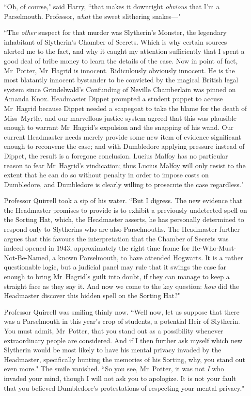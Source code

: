 ``Oh, of course," said Harry, ``that makes it downright \emph{obvious} that I'm a Parselmouth. Professor, \emph{what} the sweet slithering snakes—"

``The \emph{other} suspect for that murder was Slytherin's Monster, the legendary inhabitant of Slytherin's Chamber of Secrets. Which is why certain sources alerted me to the fact, and why it caught my attention sufficiently that I spent a good deal of bribe money to learn the details of the case. Now in point of fact, Mr~Potter, Mr~Hagrid is innocent. Ridiculously obviously innocent. He is the most blatantly innocent bystander to be convicted by the magical British legal system since Grindelwald's Confunding of Neville Chamberlain was pinned on Amanda Knox. Headmaster Dippet prompted a student puppet to accuse Mr~Hagrid because Dippet needed a scapegoat to take the blame for the death of Miss~Myrtle, and our marvellous justice system agreed that this was plausible enough to warrant Mr~Hagrid's expulsion and the snapping of his wand. Our current Headmaster needs merely provide some new item of evidence significant enough to reconvene the case; and with Dumbledore applying pressure instead of Dippet, the result is a foregone conclusion. Lucius Malfoy has no particular reason to fear Mr~Hagrid's vindication; thus Lucius Malfoy will only resist to the extent that he can do so without penalty in order to impose costs on Dumbledore, and Dumbledore is clearly willing to prosecute the case regardless."

Professor Quirrell took a sip of his water. ``But I digress. The new evidence that the Headmaster promises to provide is to exhibit a previously undetected spell on the Sorting Hat, which, the Headmaster asserts, he has personally determined to respond only to Slytherins who are also Parselmouths. The Headmaster further argues that this favours the interpretation that the Chamber of Secrets was indeed opened in 1943, approximately the right time frame for He-Who-Must-Not-Be-Named, a known Parselmouth, to have attended Hogwarts. It is a rather questionable logic, but a judicial panel may rule that it swings the case far enough to bring Mr~Hagrid's guilt into doubt, if they can manage to keep a straight face as they say it. And now we come to the key question: \emph{how} did the Headmaster discover this hidden spell on the Sorting Hat?"

Professor Quirrell was smiling thinly now. ``Well now, let us suppose that there was a Parselmouth in this year's crop of students, a potential Heir of Slytherin. You must admit, Mr~Potter, that you stand out as a possibility whenever extraordinary people are considered. And if I then further ask myself which new Slytherin would be most likely to have his mental privacy invaded by the Headmaster, specifically hunting the memories of his Sorting, why, you stand out even more." The smile vanished. ``So you see, Mr~Potter, it was not \emph{I} who invaded your mind, though I will not ask you to apologize. It is not your fault that you believed Dumbledore's protestations of respecting your mental privacy."

